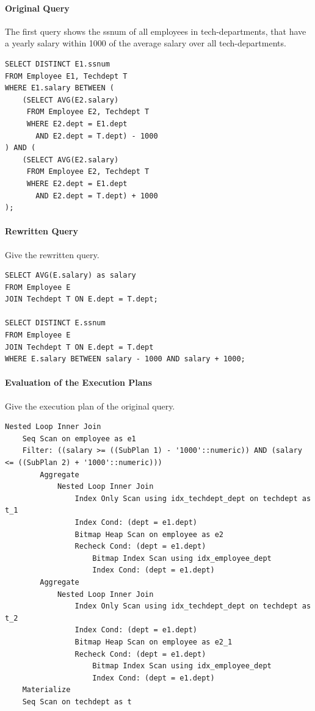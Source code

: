 \documentclass[11pt]{scrartcl}
\begin{document}
\paragraph{Original Query}

The first query shows the ssnum of all employees in tech-departments, that have a yearly salary within 1000 of the average salary over all tech-departments.

\begin{lstlisting}[style=dbtsql]
SELECT DISTINCT E1.ssnum
FROM Employee E1, Techdept T
WHERE E1.salary BETWEEN (
    (SELECT AVG(E2.salary)
     FROM Employee E2, Techdept T
     WHERE E2.dept = E1.dept
       AND E2.dept = T.dept) - 1000
) AND (
    (SELECT AVG(E2.salary)
     FROM Employee E2, Techdept T
     WHERE E2.dept = E1.dept
       AND E2.dept = T.dept) + 1000
);
\end{lstlisting}

\paragraph{Rewritten Query}

Give the rewritten query.

\begin{lstlisting}[style=dbtsql]
SELECT AVG(E.salary) as salary
FROM Employee E
JOIN Techdept T ON E.dept = T.dept;

SELECT DISTINCT E.ssnum
FROM Employee E
JOIN Techdept T ON E.dept = T.dept
WHERE E.salary BETWEEN salary - 1000 AND salary + 1000;
\end{lstlisting}

\paragraph{Evaluation of the Execution Plans}

Give the execution plan of the original query.

{\small
\parskip0pt\begin{verbatim}
Nested Loop Inner Join
	Seq Scan on employee as e1
	Filter: ((salary >= ((SubPlan 1) - '1000'::numeric)) AND (salary <= ((SubPlan 2) + '1000'::numeric)))
		Aggregate
			Nested Loop Inner Join
				Index Only Scan using idx_techdept_dept on techdept as t_1
				Index Cond: (dept = e1.dept)
				Bitmap Heap Scan on employee as e2
				Recheck Cond: (dept = e1.dept)
					Bitmap Index Scan using idx_employee_dept
					Index Cond: (dept = e1.dept)
		Aggregate
			Nested Loop Inner Join
				Index Only Scan using idx_techdept_dept on techdept as t_2
				Index Cond: (dept = e1.dept)
				Bitmap Heap Scan on employee as e2_1
				Recheck Cond: (dept = e1.dept)
					Bitmap Index Scan using idx_employee_dept
					Index Cond: (dept = e1.dept)
	Materialize
	Seq Scan on techdept as t
\end{verbatim}}
\end{document}
